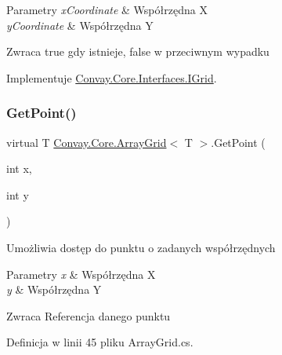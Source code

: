 \begin{DoxyParams}{Parametry}
{\em x\+Coordinate} & Współrzędna X\\
\hline
{\em y\+Coordinate} & Współrzędna Y\\
\hline
\end{DoxyParams}
\begin{DoxyReturn}{Zwraca}
true gdy istnieje, false w przeciwnym wypadku
\end{DoxyReturn}


Implementuje \hyperlink{interface_convay_1_1_core_1_1_interfaces_1_1_i_grid_a269281497dd5a218f1505d97b51d45b4}{Convay.\+Core.\+Interfaces.\+I\+Grid}.

\hypertarget{class_convay_1_1_core_1_1_array_grid_a9c0d58bccaf8fec674219fbcc8295e95}{}\label{class_convay_1_1_core_1_1_array_grid_a9c0d58bccaf8fec674219fbcc8295e95} 
\subsubsection{\texorpdfstring{Get\+Point()}{GetPoint()}}
{\footnotesize\ttfamily virtual T \hyperlink{class_convay_1_1_core_1_1_array_grid}{Convay.\+Core.\+Array\+Grid}$<$ T $>$.Get\+Point (\begin{DoxyParamCaption}\item[{int}]{x,  }\item[{int}]{y }\end{DoxyParamCaption})\hspace{0.3cm}{\ttfamily [virtual]}}



Umożliwia dostęp do punktu o zadanych współrzędnych 


\begin{DoxyParams}{Parametry}
{\em x} & Współrzędna X\\
\hline
{\em y} & Współrzędna Y\\
\hline
\end{DoxyParams}
\begin{DoxyReturn}{Zwraca}
Referencja danego punktu
\end{DoxyReturn}


Definicja w linii 45 pliku Array\+Grid.\+cs.

\hypertarget{class_convay_1_1_core_1_1_array_grid_a49501f55af9f747ed75cb94563b6d641}{}\label{class_convay_1_1_core_1_1_array_grid_a49501f55af9f747ed75cb94563b6d641} 
